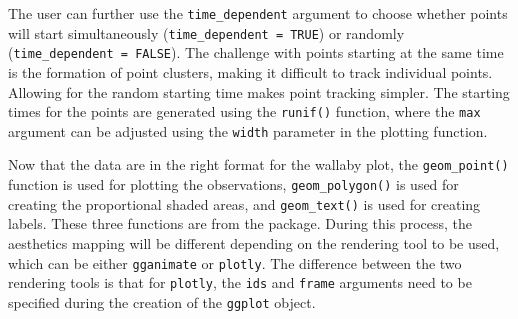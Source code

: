 The user can further use the \texttt{time\_dependent} argument to choose whether points will start simultaneously (\texttt{time\_dependent\ =\ TRUE}) or randomly (\texttt{time\_dependent\ =\ FALSE}). The challenge with points starting at the same time is the formation of point clusters, making it difficult to track individual points. Allowing for the random starting time makes point tracking simpler. The starting times for the points are generated using the \texttt{runif()} function, where the \texttt{max} argument can be adjusted using the \texttt{width} parameter in the plotting function.

Now that the data are in the right format for the wallaby plot, the \texttt{geom\_point()} function is used for plotting the observations, \texttt{geom\_polygon()} is used for creating the proportional shaded areas, and \texttt{geom\_text()} is used for creating labels. These three functions are from the  package. During this process, the aesthetics mapping will be different depending on the rendering tool to be used, which can be either \texttt{gganimate} or \texttt{plotly}. The difference between the two rendering tools is that for \texttt{plotly}, the \texttt{ids} and \texttt{frame} arguments need to be specified during the creation of the \texttt{ggplot} object.

